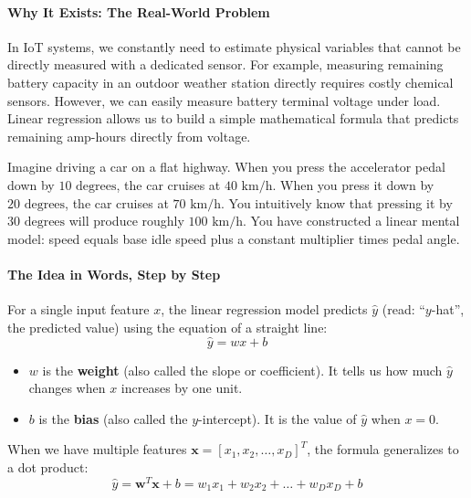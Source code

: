 \paragraph{Why It Exists: The Real-World Problem}
In IoT systems, we constantly need to estimate physical variables that cannot be directly measured with a dedicated sensor. For example, measuring remaining battery capacity in an outdoor weather station directly requires costly chemical sensors. However, we can easily measure battery terminal voltage under load. Linear regression allows us to build a simple mathematical formula that predicts remaining amp-hours directly from voltage.

\begin{analogy}
Imagine driving a car on a flat highway. When you press the accelerator pedal down by $10\text{ degrees}$, the car cruises at $40\text{ km/h}$. When you press it down by $20\text{ degrees}$, the car cruises at $70\text{ km/h}$. You intuitively know that pressing it by $30\text{ degrees}$ will produce roughly $100\text{ km/h}$. You have constructed a linear mental model: speed equals base idle speed plus a constant multiplier times pedal angle.
\end{analogy}

\paragraph{The Idea in Words, Step by Step}
For a single input feature $x$, the linear regression model predicts $\hat{y}$ (read: ``$y$-hat'', the predicted value) using the equation of a straight line:
\begin{equation}
\hat{y} = w x + b\label{eq:simple_linear}
\end{equation}
\begin{itemize}
    \item $w$ is the \textbf{weight} (also called the slope or coefficient). It tells us how much $\hat{y}$ changes when $x$ increases by one unit.
    \item $b$ is the \textbf{bias} (also called the $y$-intercept). It is the value of $\hat{y}$ when $x = 0$.
\end{itemize}
When we have multiple features $\mathbf{x} = [x_1, x_2, \dots, x_D]^T$, the formula generalizes to a dot product:
\begin{equation}
\hat{y} = \mathbf{w}^T \mathbf{x} + b = w_1 x_1 + w_2 x_2 + \dots + w_D x_D + b\label{eq:multiple_linear}
\end{equation}


